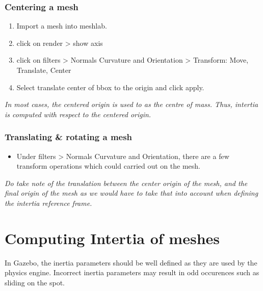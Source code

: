 \documentclass[11pt]{article}
\begin{document}
\subsubsection{Centering a mesh}
\begin{enumerate}
 \item {
       Import a mesh into meshlab.
       }
 \item{
       click on render > show axis
       }
 \item{
       click on filters > Normals Curvature and Orientation > Transform: Move, Translate, Center
       }
 \item{
       Select translate center of bbox to the origin and click apply.
       
       }
       
\end{enumerate}
\emph{In most cases, the centered origin is used to as the centre of mass. Thus, intertia is computed with respect to the centered origin.}
\subsubsection{Translating \& rotating a mesh}
\begin{itemize}
 \item {
       Under filters > Normals Curvature and Orientation, there are a few transform operations which could carried out on the mesh.
       }
\end{itemize}

\emph{Do take note of the translation between the center origin of the mesh, and the final origin of the mesh as we would have to take that into account when defining the intertia reference frame.}
\section{Computing Intertia of meshes}
In Gazebo, the inertia parameters should be well defined as they are used by the physics engine.
Incorrect inertia parameters may result in odd occurences such as sliding on the spot.
\end{document}
